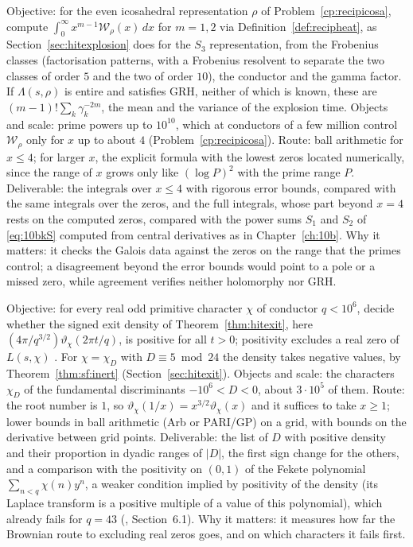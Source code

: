 \begin{compproblem}\label{cp:hitexplosion}
Objective: for the even icosahedral representation $\rho$ of Problem~\ref{cp:recipicosa}, compute $\int_0^\infty x^{m-1}\mathcal W_\rho(x)\,dx$ for $m=1,2$ via Definition~\ref{def:recipheat}, as Section~\ref{sec:hitexplosion} does for the $S_3$ representation, from the Frobenius classes (factorisation patterns, with a Frobenius resolvent \cite{dokchitser2013} to separate the two classes of order $5$ and the two of order $10$), the conductor and the gamma factor. If $\Lambda(s,\rho)$ is entire and satisfies GRH, neither of which is known, these are $(m-1)!\sum_k\gamma_k^{-2m}$, the mean and the variance of the explosion time. Objects and scale: prime powers up to $10^{10}$, which at conductors of a few million control $\mathcal W_\rho$ only for $x$ up to about $4$ (Problem~\ref{cp:recipicosa}). Route: ball arithmetic for $x\le4$; for larger $x$, the explicit formula with the lowest zeros located numerically, since the range of $x$ grows only like $(\log P)^2$ with the prime range $P$. Deliverable: the integrals over $x\le4$ with rigorous error bounds, compared with the same integrals over the zeros, and the full integrals, whose part beyond $x=4$ rests on the computed zeros, compared with the power sums $S_1$ and $S_2$ of \eqref{eq:10bkS} computed from central derivatives as in Chapter~\ref{ch:10b}. Why it matters: it checks the Galois data against the zeros on the range that the primes control; a disagreement beyond the error bounds would point to a pole or a missed zero, while agreement verifies neither holomorphy nor GRH.
\end{compproblem}

\begin{compproblem}\label{cp:hitexit}
Objective: for every real odd primitive character $\chi$ of conductor $q<10^6$, decide whether the signed exit density of Theorem~\ref{thm:hitexit}, here $(4\pi/q^{3/2})\vartheta_\chi(2\pi t/q)$, is positive for all $t>0$; positivity excludes a real zero of $L(s,\chi)$ \cite{bpy2001}. For $\chi=\chi_D$ with $D\equiv5\bmod24$ the density takes negative values, by Theorem~\ref{thm:sf:inert} (Section~\ref{sec:hitexit}). Objects and scale: the characters $\chi_D$ of the fundamental discriminants $-10^6<D<0$, about $3\cdot10^5$ of them. Route: the root number is $1$, so $\vartheta_\chi(1/x)=x^{3/2}\vartheta_\chi(x)$ and it suffices to take $x\ge1$; lower bounds in ball arithmetic (Arb or PARI/GP) on a grid, with bounds on the derivative between grid points. Deliverable: the list of $D$ with positive density and their proportion in dyadic ranges of $|D|$, the first sign change for the others, and a comparison with the positivity on $(0,1)$ of the Fekete polynomial $\sum_{n<q}\chi(n)y^n$, a weaker condition implied by positivity of the density (its Laplace transform is a positive multiple of a value of this polynomial), which already fails for $q=43$ (\cite{bpy2001}, Section~6.1). Why it matters: it measures how far the Brownian route to excluding real zeros goes, and on which characters it fails first.
\end{compproblem}
